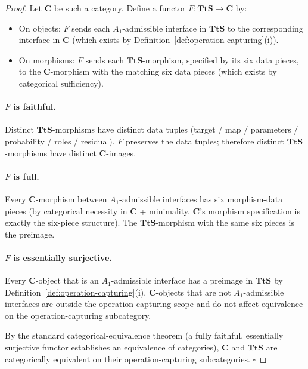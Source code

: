 \begin{proof}
Let $\mathbf{C}$ be such a category. Define a functor $F: \mathbf{TtS} \to \mathbf{C}$ by:
\begin{itemize}
\item On objects: $F$ sends each $A_1$-admissible interface in $\mathbf{TtS}$ to the corresponding interface in $\mathbf{C}$ (which exists by Definition~\ref{def:operation-capturing}(i)).
\item On morphisms: $F$ sends each $\mathbf{TtS}$-morphism, specified by its six data pieces, to the $\mathbf{C}$-morphism with the matching six data pieces (which exists by categorical sufficiency).
\end{itemize}

\paragraph{$F$ is faithful.} Distinct $\mathbf{TtS}$-morphisms have distinct data tuples (target / map / parameters / probability / roles / residual). $F$ preserves the data tuples; therefore distinct $\mathbf{TtS}$-morphisms have distinct $\mathbf{C}$-images.

\paragraph{$F$ is full.} Every $\mathbf{C}$-morphism between $A_1$-admissible interfaces has six morphism-data pieces (by categorical necessity in $\mathbf{C}$ + minimality, $\mathbf{C}$'s morphism specification is exactly the six-piece structure). The $\mathbf{TtS}$-morphism with the same six pieces is the preimage.

\paragraph{$F$ is essentially surjective.} Every $\mathbf{C}$-object that is an $A_1$-admissible interface has a preimage in $\mathbf{TtS}$ by Definition~\ref{def:operation-capturing}(i). $\mathbf{C}$-objects that are not $A_1$-admissible interfaces are outside the operation-capturing scope and do not affect equivalence on the operation-capturing subcategory.

By the standard categorical-equivalence theorem (a fully faithful, essentially surjective functor establishes an equivalence of categories), $\mathbf{C}$ and $\mathbf{TtS}$ are categorically equivalent on their operation-capturing subcategories. $\square$
\end{proof}

